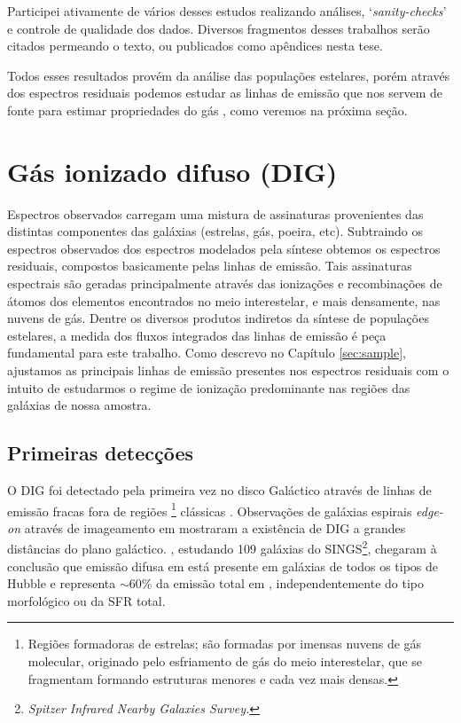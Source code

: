 Participei ativamente de vários desses estudos realizando análises, `{\em sanity-checks}' e controle de qualidade dos dados. Diversos fragmentos desses trabalhos serão citados permeando o texto, ou publicados como apêndices nesta tese.

Todos esses resultados provém da análise das populações estelares, porém através dos espectros residuais
podemos estudar as linhas de emissão que nos servem de fonte para estimar propriedades do gás \citep{Asari.etal.2007a}, como veremos na próxima seção.


\section{Gás ionizado difuso (DIG)}
\label{sec:intro:DIG}

Espectros observados carregam uma mistura de assinaturas provenientes das distintas componentes das galáxias (estrelas, gás, poeira, etc). Subtraindo os espectros observados dos espectros modelados pela síntese obtemos os espectros residuais, compostos basicamente pelas linhas de emissão. Tais assinaturas espectrais são geradas principalmente através das ionizações e recombinações de átomos dos elementos encontrados no meio interestelar, e mais densamente, nas nuvens de gás. Dentre os diversos produtos indiretos da síntese de populações estelares, a medida dos fluxos integrados das linhas de emissão é peça fundamental para este trabalho.
Como descrevo no Capítulo \ref{sec:sample}, ajustamos as principais linhas de emissão presentes nos espectros residuais com o intuito de estudarmos o regime de ionização predominante nas regiões das galáxias de nossa amostra.

\subsection{Primeiras detecções}
\label{sec:intro:DIG:first}
O DIG foi detectado pela primeira vez no disco Galáctico através de linhas de emissão fracas fora de regiões \hii\footnote{Regiões formadoras de estrelas; são formadas por imensas nuvens de gás molecular, originado pelo esfriamento de gás do meio interestelar, que se fragmentam formando estruturas menores e cada vez mais densas.} clássicas \citep{Reynolds.PhD.1971}. Observações de galáxias espirais {\em edge-on} através de imageamento em \Ha \citep{Dettmar.1990, HoopesWaltGreen.1996, HoopesWaltRand.1999} mostraram a existência de DIG a grandes distâncias do plano galáctico. \cite{Oey.etal.2007}, estudando 109 galáxias do SINGS\footnote{\em Spitzer Infrared Nearby Galaxies Survey.}, chegaram à conclusão que emissão difusa em \Ha está presente em galáxias de todos os tipos de Hubble e representa $\sim60\%$ da emissão total em \Ha, independentemente do tipo morfológico ou da SFR total.

